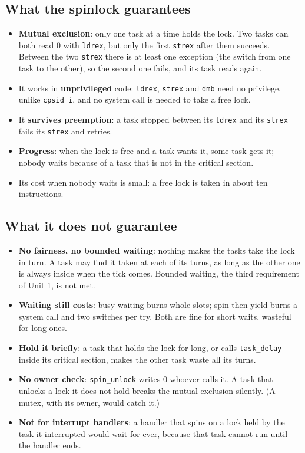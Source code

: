 \subsection{What the spinlock guarantees}
\begin{itemize}
    \item \textbf{Mutual exclusion}: only one task at a time holds the lock. Two tasks can both read 0 with \texttt{ldrex}, but only the first \texttt{strex} after them succeeds. Between the two \texttt{strex} there is at least one exception (the switch from one task to the other), so the second one fails, and its task reads again.
    \item It works in \textbf{unprivileged} code: \texttt{ldrex}, \texttt{strex} and \texttt{dmb} need no privilege, unlike \texttt{cpsid i}, and no system call is needed to take a free lock.
    \item It \textbf{survives preemption}: a task stopped between its \texttt{ldrex} and its \texttt{strex} fails its \texttt{strex} and retries.
    \item \textbf{Progress}: when the lock is free and a task wants it, some task gets it; nobody waits because of a task that is not in the critical section.
    \item Its cost when nobody waits is small: a free lock is taken in about ten instructions.
\end{itemize}

\subsection{What it does not guarantee}
\begin{itemize}
    \item \textbf{No fairness, no bounded waiting}: nothing makes the tasks take the lock in turn. A task may find it taken at each of its turns, as long as the other one is always inside when the tick comes. Bounded waiting, the third requirement of Unit 1, is not met.
    \item \textbf{Waiting still costs}: busy waiting burns whole slots; spin-then-yield burns a system call and two switches per try. Both are fine for short waits, wasteful for long ones.
    \item \textbf{Hold it briefly}: a task that holds the lock for long, or calls \texttt{task\_delay} inside its critical section, makes the other task waste all its turns.
    \item \textbf{No owner check}: \texttt{spin\_unlock} writes 0 whoever calls it. A task that unlocks a lock it does not hold breaks the mutual exclusion silently. (A mutex, with its owner, would catch it.)
    \item \textbf{Not for interrupt handlers}: a handler that spins on a lock held by the task it interrupted would wait for ever, because that task cannot run until the handler ends.
\end{itemize}

